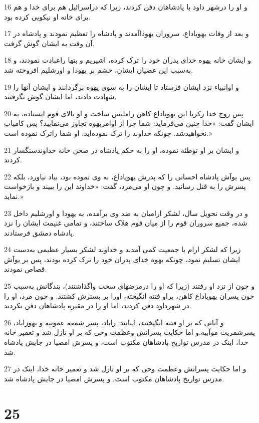 \par 16 و او را درشهر داود با پادشاهان دفن کردند، زیرا که دراسرائیل هم برای خدا و هم برای خانه او نیکویی کرده بود. 
\par 17 و بعد از وفات یهویاداع، سروران یهوداآمدند و پادشاه را تعظیم نمودند و پادشاه در آن وقت به ایشان گوش گرفت.
\par 18 و ایشان خانه یهوه خدای پدران خود را ترک کرده، اشیریم و بتها راعبادت نمودند، و به‌سبب این عصیان ایشان، خشم بر یهودا و اورشلیم افروخته شد.
\par 19 و اوانبیاء نزد ایشان فرستاد تا ایشان را به سوی یهوه برگردانند و ایشان آنها را شهادت دادند، اما ایشان گوش نگرفتند.
\par 20 پس روح خدا زکریا ابن یهویاداع کاهن راملبس ساخت و او بالای قوم ایستاده، به ایشان گفت: «خدا چنین می‌فرماید: شما چرا از اوامریهوه تجاوز می‌نمایید؟ پس کامیاب نخواهیدشد. چونکه خداوند را ترک نموده‌اید، او شما راترک نموده است.»
\par 21 و ایشان بر او توطئه نموده، او را به حکم پادشاه در صحن خانه خداوندسنگسار کردند.
\par 22 پس یوآش پادشاه احسانی را که پدرش یهویاداع، به وی نموده بود، بیاد نیاورد، بلکه پسرش را به قتل رسانید. و چون او می‌مرد، گفت: «خداوند این را ببیند و بازخواست نماید.»
\par 23 و در وقت تحویل سال، لشکر ارامیان به ضد وی برآمده، به یهودا و اورشلیم داخل شده، جمیع سروران قوم را از میان قوم هلاک ساختند، و تمامی غنیمت ایشان را نزد پادشاه دمشق فرستادند.
\par 24 زیرا که لشکر ارام با جمعیت کمی آمدند و خداوند لشکر بسیار عظیمی به‌دست ایشان تسلیم نمود، چونکه یهوه خدای پدران خود را ترک کرده بودند، پس بر یوآش قصاص نمودند.
\par 25 و چون از نزد او رفتند (زیرا که او را درمرضهای سخت واگذاشتند)، بندگانش به‌سبب خون پسران یهویاداع کاهن، براو فتنه انگیخته، اورا بر بسترش کشتند. و چون مرد، او را در شهرداود دفن کردند، اما او را در مقبره پادشاهان دفن نکردند.
\par 26 و آنانی که بر او فتنه انگیختند، اینانند: زاباد، پسر شمعه عمونیه و یهوزاباد، پسرشمریت موآبیه.و اما حکایت پسرانش وعظمت وحی که بر او نازل شد و تعمیر خانه خدا، اینک در مدرس تواریخ پادشاهان مکتوب است، و پسرش امصیا در جایش پادشاه شد.
\par 27 و اما حکایت پسرانش وعظمت وحی که بر او نازل شد و تعمیر خانه خدا، اینک در مدرس تواریخ پادشاهان مکتوب است، و پسرش امصیا در جایش پادشاه شد.
 
\chapter{25}

